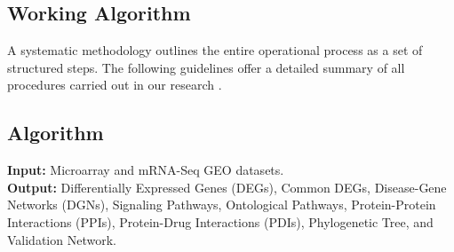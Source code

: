 \vspace*{-\parskip}
\subsection{Working Algorithm}
\label{sec:working_algorithm}

A systematic methodology outlines the entire operational process as a set of structured steps. The following guidelines offer a detailed summary of all procedures carried out in our research \cite{b39}.

\vspace*{-\parskip}
\subsection{Algorithm}
\label{sec:algorithm}

\textbf{Input:} Microarray and mRNA-Seq GEO datasets. \\
\textbf{Output:} Differentially Expressed Genes (DEGs), Common DEGs, Disease-Gene Networks (DGNs), Signaling Pathways, Ontological Pathways, Protein-Protein Interactions (PPIs), Protein-Drug Interactions (PDIs), Phylogenetic Tree, and Validation Network.

